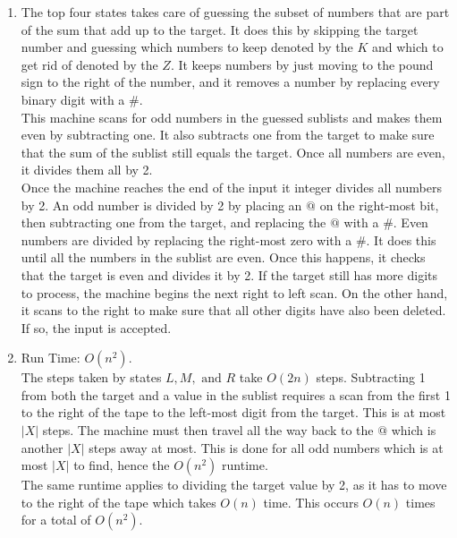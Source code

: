 \begin{solution}

\begin{enumerate}
	\item The top four states takes care of guessing the subset of numbers that are part of the sum that add up to the target. It does this by skipping the target number and guessing which numbers to keep denoted by the $K$ and which to get rid of denoted by the $Z$. It keeps numbers by just moving to the pound sign to the right of the number, and it removes a number by replacing every binary digit with a $\#$.\\
	This machine scans for odd numbers in the guessed sublists and makes them even by subtracting one. It also subtracts one from the target to make sure that the sum of the sublist still equals the target. Once all numbers are even, it divides them all by 2.\\
	Once the machine reaches the end of the input it integer divides all numbers by 2. An odd number is divided by 2 by placing an $@$ on the right-most bit, then subtracting one from the target, and replacing the $@$ with a $\#$. Even numbers are divided by replacing the right-most zero with a $\#$. It does this until all the numbers in the sublist are even. Once this happens, it checks that the target is even and divides it by 2. If the target still has more digits to process, the machine begins the next right to left scan. On the other hand, it scans to the right to make sure that all other digits have also been deleted. If so, the input is accepted.
	\item Run Time: $O(n^2)$.\\
	The steps taken by states $L,M,\mbox{ and }R$ take $O(2n)$ steps. Subtracting 1 from both the target and a value in the sublist requires a scan from the first 1 to the right of the tape to the left-most digit from the target. This is at most $|X|$ steps. The machine must then travel all the way back to the $@$ which is another $|X|$ steps away at most. This is done for all odd numbers which is at most $|X|$ to find, hence the $O(n^2)$ runtime.\\
	The same runtime applies to dividing the target value by 2, as it has to move to the right of the tape which takes $O(n)$ time. This occurs $O(n)$ times for a total of $O(n^2)$.
\end{enumerate}


\end{solution}
